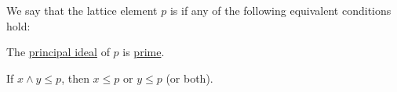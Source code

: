 \begin{definition}\label{def:lattice_prime_element}
  We say that the lattice element \( p \) is  if any of the following equivalent conditions hold:
  \begin{thmenum}
     The \hyperref[def:lattice_ideal/principal]{principal ideal} of \( p \) is \hyperref[def:lattice_ideal/prime]{prime}.

    \mimprovised If \( x \wedge y \leq p \), then \( x \leq p \) or \( y \leq p \) (or both).
  \end{thmenum}
\end{definition}
